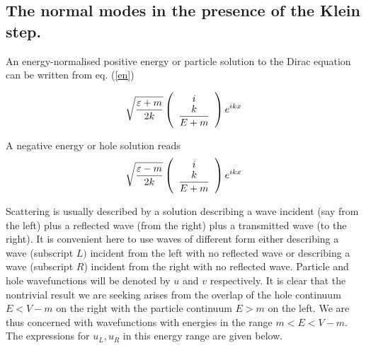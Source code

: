 \subsection{The normal modes in the presence of the Klein step.}

\noindent An energy-normalised positive energy or particle solution to the
Dirac equation can be written from eq. (\ref{en})

\begin{equation}  \label{pos}
\sqrt{%
{\displaystyle {\varepsilon +m \over 2k}}
}\left( 
\begin{array}{c}
i \\ 
{\displaystyle {k \over E+m}}
\end{array}
\right) e^{ikx}
\end{equation}

\noindent A negative energy or hole solution reads 
\[
\sqrt{%
{\displaystyle {\varepsilon -m \over 2k}}
}\left( 
\begin{array}{c}
i \\ 
{\displaystyle {k \over E+m}}
\end{array}
\right) e^{ikx} 
\]

\noindent Scattering is usually described by a solution describing a wave
incident (say from the left) plus a reflected wave (from the right) plus a
transmitted wave (to the right). It is convenient here to use waves of
different form either describing a wave (subscript $L)$ incident from the
left with no reflected wave or describing a wave (subscript $R$) incident
from the right with no reflected wave. Particle and hole wavefunctions will
be denoted by $u$ and $v$ respectively. It is clear that the nontrivial
result we are seeking arises from the overlap of the hole continuum $E<V-m$
on the right with the particle continuum $E>m$ on the left. We are thus
concerned with wavefunctions with energies in the range $m<E<V-m.$ The
expressions for $u_L,u_R$ in this energy range are given below.

\ 

